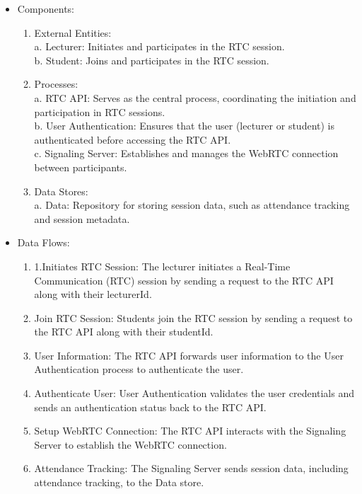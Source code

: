 \documentclass[a4paper,12pt]{article}  %
\begin{document}
\begin{itemize}
      \item Components:
            \begin{enumerate}
                  \item External Entities:\\ a. Lecturer: Initiates and participates in the RTC
                        session.\\ b. Student: Joins and participates in the RTC session.\\
                  \item Processes: \\ a. RTC API: Serves as the central process, coordinating the
                        initiation and participation in RTC sessions.\\ b. User Authentication: Ensures
                        that the user (lecturer or student) is authenticated before accessing the RTC
                        API.\\ c. Signaling Server: Establishes and manages the WebRTC connection
                        between participants.\\
                  \item Data Stores:\\ a. Data: Repository for storing session data, such as attendance
                        tracking and session metadata.\\
            \end{enumerate}
      \item Data Flows:
            \begin{enumerate}
                  \item 1.Initiates RTC Session: The lecturer initiates a Real-Time Communication (RTC) session by sending a request to the RTC API along with their lecturerId.\\
                  \item Join RTC Session: Students join the RTC session by sending a request to the RTC
                        API along with their studentId.\\
                  \item User Information: The RTC API forwards user information to the User
                        Authentication process to authenticate the user.\\
                  \item Authenticate User: User Authentication validates the user credentials and sends
                        an authentication status back to the RTC API.\\
                  \item Setup WebRTC Connection: The RTC API interacts with the Signaling Server to
                        establish the WebRTC connection.\\
                  \item Attendance Tracking: The Signaling Server sends session data, including
                        attendance tracking, to the Data store.\\
            \end{enumerate}
\end{itemize}
\end{document}
